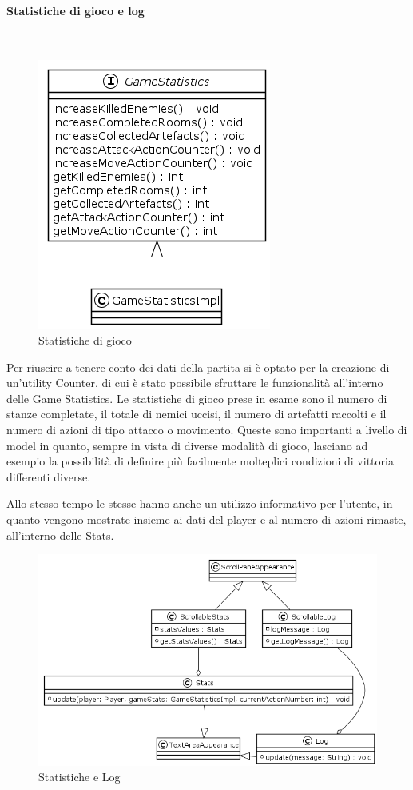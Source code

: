\documentclass[a4paper,titlepage,12pt]{article}
\begin{document}
\paragraph{Statistiche di gioco e log}
\par \noindent \\
\begin{figure}[H]
    \centering
    \includegraphics[scale=0.8]{img/uml/GameStatistics.png}
    \caption{Statistiche di gioco}
    \label{fig: Game Statistics}
\end{figure}
\par \noindent Per riuscire a tenere conto dei dati della partita si è optato per la creazione di un'utility Counter, di cui è stato possibile sfruttare le funzionalità all'interno delle Game Statistics. Le statistiche di gioco prese in esame sono il numero di stanze completate, il totale di nemici uccisi, il numero di artefatti raccolti e il numero di azioni di tipo attacco o movimento.
Queste sono importanti a livello di model in quanto, sempre in vista di diverse modalità di gioco, lasciano ad esempio la possibilità di definire più facilmente molteplici condizioni di vittoria differenti diverse.
\par \noindent Allo stesso tempo le stesse hanno anche un utilizzo informativo per l'utente, in quanto vengono mostrate insieme ai dati del player e al numero di azioni rimaste, all'interno delle Stats.
\begin{figure}[H]
    \centering
    \includegraphics[scale=0.55]{img/uml/StatsLog.png}
    \caption{Statistiche e Log}
    \label{fig:Statistiche e log}
\end{figure}
\end{document}
